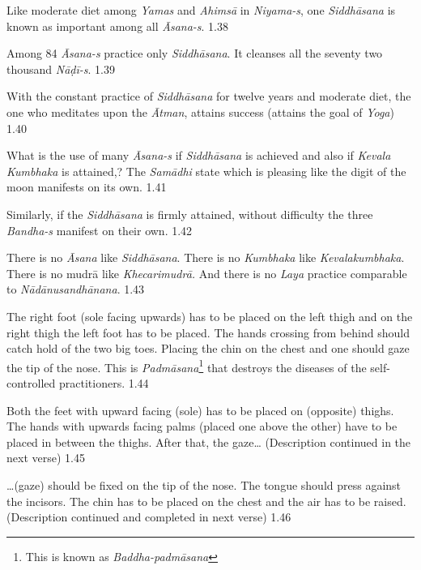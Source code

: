 
Like moderate diet  among \textit{Yamas} and \textit{Ahimsā} in \textit{Niyama-s}, one \textit{Siddhāsana} is known as important among all \textit{Āsana-s}.  1.38

Among 84 \textit{Āsana-s} practice only \textit{Siddhāsana}. It cleanses all the seventy two thousand \textit{Nāḍī-s}.  1.39

With the constant practice of \textit{Siddhāsana} for twelve years and moderate diet, the one who meditates upon the \textit{Ātman},  attains success (attains the goal of \textit{Yoga}) 1.40

What is the use of many \textit{Āsana-s} if \textit{Siddhāsana} is achieved and also if \textit{Kevala Kumbhaka} is attained,? The \textit{Samādhi} state which is pleasing like the digit of the moon manifests on its own. 1.41

Similarly, if the \textit{Siddhāsana} is firmly attained, without difficulty the three \textit{Bandha-s} manifest on their own.   1.42

There is no \textit{Āsana} like \textit{Siddhāsana}. There is no \textit{Kumbhaka} like \textit{Kevalakumbhaka}. There is no mudrā like \textit{Khecarimudrā.} And there is no \textit{Laya} practice comparable to \textit{Nādānusandhānana}. 1.43
\medskip


The right foot (sole facing upwards) has to be placed on the left thigh and on the right thigh the left foot has to be placed. The hands crossing from behind should catch hold of the two big toes. Placing the chin on the chest and one should gaze the tip of the nose. This is \textit{Padmāsana}\footnote{This is known as \textit{Baddha-padmāsana}} that destroys the diseases of the self-controlled practitioners. 1.44


Both the feet with upward facing (sole) has to be placed on (opposite) thighs. The hands with upwards facing palms (placed one above the other) have to be placed in between the thighs. After that, the gaze… (Description continued in the next verse) 1.45

…(gaze) should be fixed on the tip of the nose. The tongue should press against the incisors. The chin has to be placed on the chest and the air has to be raised. (Description continued and completed in next verse) 1.46

